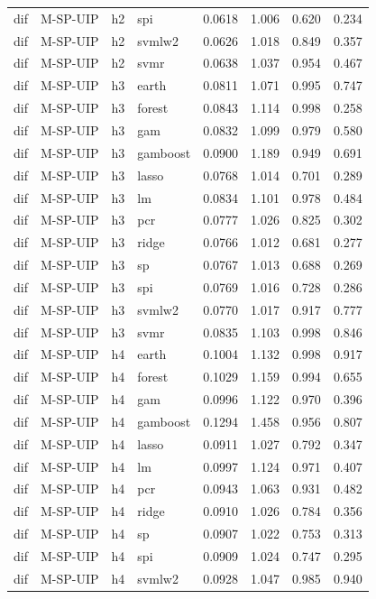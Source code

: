 \begin{ThreePartTable}
\begin{longtable}[t]{llclcccc}
dif & M-SP-UIP & h2 & spi & 0.0618 & 1.006 & 0.620 & 0.234\\
dif & M-SP-UIP & h2 & svmlw2 & 0.0626 & 1.018 & 0.849 & 0.357\\
dif & M-SP-UIP & h2 & svmr & 0.0638 & 1.037 & 0.954 & 0.467\\
\addlinespace
dif & M-SP-UIP & h3 & earth & 0.0811 & 1.071 & 0.995 & 0.747\\
dif & M-SP-UIP & h3 & forest & 0.0843 & 1.114 & 0.998 & 0.258\\
dif & M-SP-UIP & h3 & gam & 0.0832 & 1.099 & 0.979 & 0.580\\
dif & M-SP-UIP & h3 & gamboost & 0.0900 & 1.189 & 0.949 & 0.691\\
dif & M-SP-UIP & h3 & lasso & 0.0768 & 1.014 & 0.701 & 0.289\\
dif & M-SP-UIP & h3 & lm & 0.0834 & 1.101 & 0.978 & 0.484\\
dif & M-SP-UIP & h3 & pcr & 0.0777 & 1.026 & 0.825 & 0.302\\
dif & M-SP-UIP & h3 & ridge & 0.0766 & 1.012 & 0.681 & 0.277\\
dif & M-SP-UIP & h3 & sp & 0.0767 & 1.013 & 0.688 & 0.269\\
dif & M-SP-UIP & h3 & spi & 0.0769 & 1.016 & 0.728 & 0.286\\
dif & M-SP-UIP & h3 & svmlw2 & 0.0770 & 1.017 & 0.917 & 0.777\\
dif & M-SP-UIP & h3 & svmr & 0.0835 & 1.103 & 0.998 & 0.846\\
\addlinespace
dif & M-SP-UIP & h4 & earth & 0.1004 & 1.132 & 0.998 & 0.917\\
dif & M-SP-UIP & h4 & forest & 0.1029 & 1.159 & 0.994 & 0.655\\
dif & M-SP-UIP & h4 & gam & 0.0996 & 1.122 & 0.970 & 0.396\\
dif & M-SP-UIP & h4 & gamboost & 0.1294 & 1.458 & 0.956 & 0.807\\
dif & M-SP-UIP & h4 & lasso & 0.0911 & 1.027 & 0.792 & 0.347\\
dif & M-SP-UIP & h4 & lm & 0.0997 & 1.124 & 0.971 & 0.407\\
dif & M-SP-UIP & h4 & pcr & 0.0943 & 1.063 & 0.931 & 0.482\\
dif & M-SP-UIP & h4 & ridge & 0.0910 & 1.026 & 0.784 & 0.356\\
dif & M-SP-UIP & h4 & sp & 0.0907 & 1.022 & 0.753 & 0.313\\
dif & M-SP-UIP & h4 & spi & 0.0909 & 1.024 & 0.747 & 0.295\\
dif & M-SP-UIP & h4 & svmlw2 & 0.0928 & 1.047 & 0.985 & 0.940\\

\end{longtable}
\end{ThreePartTable}
